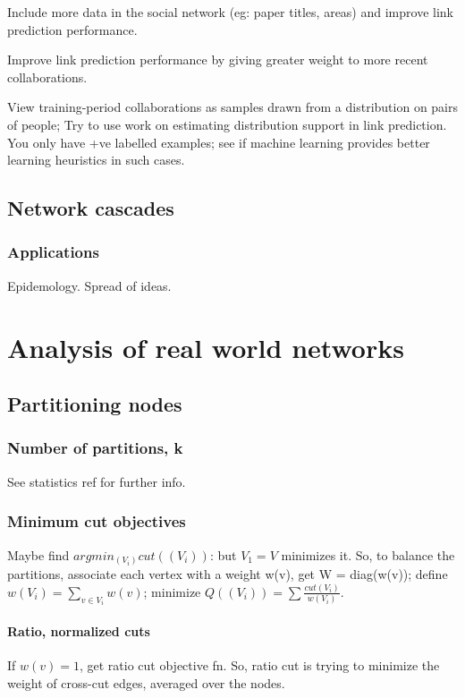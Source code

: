 \documentclass[oneside, article]{memoir}
\begin{document}
\oprob Include more data in the social network (eg: paper titles, areas) and improve link prediction performance.

\oprob Improve link prediction performance by giving greater weight to more recent collaborations.

\oprob View training-period collaborations as samples drawn from a distribution on pairs of people; Try to use work on estimating distribution support in link prediction. \oprob You only have +ve labelled examples; see if machine learning provides better learning heuristics in such cases.

\chapter{Network cascades}
\section{Applications}
Epidemology. Spread of ideas.

\part{Analysis of real world networks}
\chapter{Partitioning nodes}
\section{Number of partitions, k}
See statistics ref for further info.

\section{Minimum cut objectives}
Maybe find $argmin_{(V_{i})} cut((V_{i}))$: but $V_{1} = V$ minimizes it. So, to balance the partitions, associate each vertex with a weight w(v), get W = diag(w(v)); define $w(V_{i}) = \sum_{v \in V_{i}} w(v)$; minimize $Q((V_{i})) = \sum \frac{cut(V_{i})}{w(V_{i})}$.

\subsection{Ratio, normalized cuts}
If $w(v) = 1$, get ratio cut objective fn. So, ratio cut is trying to minimize the weight of cross-cut edges, averaged over the nodes.
\end{document}
